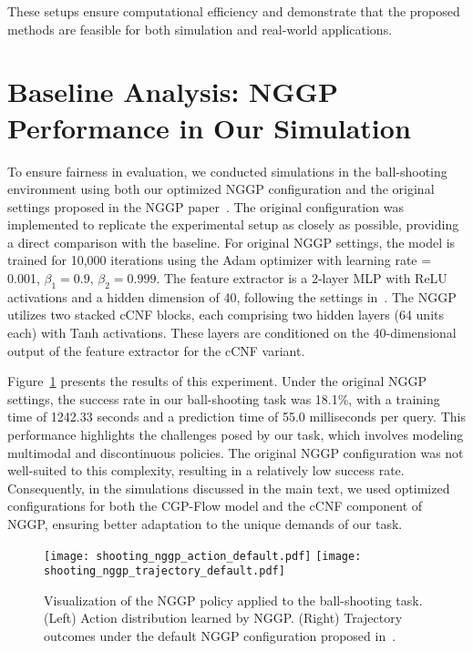 \documentclass[sn-mathphys-num]{sn-jnl}
\begin{document}
These setups ensure computational efficiency and demonstrate that the proposed methods are feasible for both simulation and real-world applications.

\section{Baseline Analysis: NGGP Performance in Our Simulation}\label{appendix:baseline:nggp}
To ensure fairness in evaluation, we conducted simulations in the ball-shooting environment using both our optimized NGGP configuration and the original settings proposed in the NGGP paper~\cite{sendera2021non}.
The original configuration was implemented to replicate the experimental setup as closely as possible, providing a direct comparison with the baseline.
For original NGGP settings, the model is trained for 10,000 iterations using the Adam optimizer with learning rate = 0.001, $\beta_1 = 0.9$, $\beta_2 = 0.999$.
The feature extractor is a 2-layer MLP with ReLU activations and a hidden dimension of 40, following the settings in~\cite{sendera2021non}.
The NGGP utilizes two stacked cCNF blocks, each comprising two hidden layers (64 units each) with Tanh activations. These layers are conditioned on the 40-dimensional output of the feature extractor for the cCNF variant. 

Figure~\ref{fig:shooting:nggp_compare} presents the results of this experiment.
Under the original NGGP settings, the success rate in our ball-shooting task was 18.1\%, with a training time of 1242.33 seconds and a prediction time of 55.0 milliseconds per query.
This performance highlights the challenges posed by our task, which involves modeling multimodal and discontinuous policies.
The original NGGP configuration was not well-suited to this complexity, resulting in a relatively low success rate. Consequently, in the simulations discussed in the main text, we used optimized configurations for both the CGP-Flow model and the cCNF component of NGGP, ensuring better adaptation to the unique demands of our task.


\begin{figure}[t]
    \centering
    \begin{minipage}[t]{0.9\linewidth}
        \centering
        \texttt{[image: shooting\_nggp\_action\_default.pdf]}
        \texttt{[image: shooting\_nggp\_trajectory\_default.pdf]}
    \end{minipage}
    \caption{Visualization of the NGGP policy applied to the ball-shooting task. (Left) Action distribution learned by NGGP. (Right) Trajectory outcomes under the default NGGP configuration proposed in~\cite{sendera2021non}.}
    \label{fig:shooting:nggp_compare}
\end{figure}

 

\end{document}
